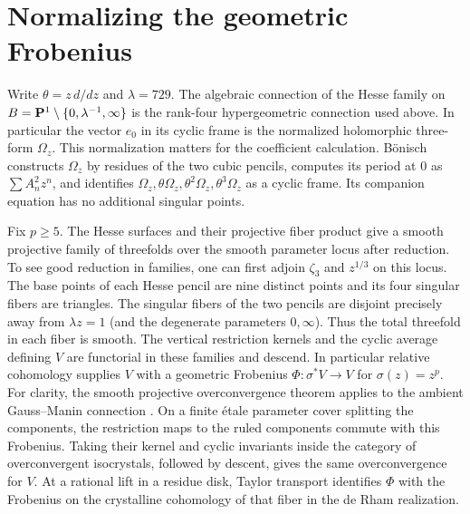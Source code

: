 \documentclass[11pt,letterpaper]{article}
\theoremstyle{definition}
\theoremstyle{remark}
\begin{document}
\section{Normalizing the geometric Frobenius}\label{IV:sec:normalization}
Write $\theta=z\,d/dz$ and $\lambda=729$. The algebraic connection of the
Hesse family on $B=\mathbf P^1\setminus\{0,\lambda^{-1},\infty\}$ is the
rank-four hypergeometric connection used above. In particular the vector
$e_0$ in its cyclic frame is the normalized holomorphic three-form
$\Omega_z$. This normalization matters for the coefficient calculation.
B\"onisch \cite[\S5.1]{IV:bonisch} constructs $\Omega_z$ by residues of the two
cubic pencils, computes its period at $0$ as $\sum A_n^2z^n$, and
identifies $\Omega_z,\theta\Omega_z,\theta^2\Omega_z,\theta^3\Omega_z$ as
a cyclic frame. Its companion equation has no additional singular points.

Fix $p\ge5$. The Hesse surfaces and their projective fiber product
give a smooth projective family of threefolds over the smooth parameter
locus after reduction. To see good reduction in families,
one can first adjoin $\zeta_3$ and $z^{1/3}$ on this locus. The
base points of each Hesse pencil are nine distinct points and its
four singular fibers are triangles. The singular fibers of the two
pencils are disjoint precisely away from $\lambda z=1$ (and the
degenerate parameters $0,\infty$). Thus the total threefold in each
fiber is smooth. The vertical restriction kernels and the cyclic
average defining $V$ are functorial in these families and descend.
In particular relative cohomology supplies $V$ with a geometric
Frobenius $\Phi:\sigma^*V\to V$ for $\sigma(z)=z^p$. For clarity, the
smooth projective overconvergence theorem applies to the ambient
Gauss--Manin connection \cite[Corollary~6.4]{IV:lazda}. On a finite \'etale parameter cover splitting the components,
the restriction maps to the ruled components commute with this
Frobenius. Taking their kernel and cyclic invariants inside the
category of overconvergent isocrystals, followed by descent, gives
the same overconvergence for $V$. At a rational lift in a residue
disk, Taylor transport identifies $\Phi$ with the Frobenius on the
crystalline cohomology of that fiber in the de Rham realization.
\end{document}
